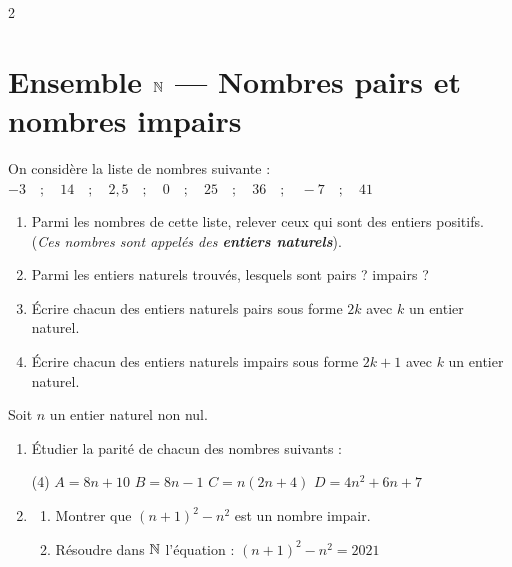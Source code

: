 \documentclass[10pt, a4paper]{article}
\begin{document}
\vspace{0.4cm}

\begin{multicols*}{2}

\section{Ensemble $\mathbb{N}$ --- Nombres pairs et nombres impairs}

\begin{Activite}[][10 min]
On considère la liste de nombres suivante :
$-3 \quad ; \quad 14 \quad ; \quad 2,5 \quad ; \quad 0 \quad ; \quad 25 \quad ; \quad 36 \quad ; \quad -7 \quad ; \quad 41$
\begin{enumerate}[leftmargin=*,itemsep=0.5pt]
    \item Parmi les nombres de cette liste, relever ceux qui sont des entiers positifs. \\
    (\textit{Ces nombres sont appelés des \textbf{entiers naturels}}).

    \item Parmi les entiers naturels trouvés, lesquels sont pairs ? impairs ?

    \item Écrire chacun des entiers naturels pairs sous forme $2k$ avec $k$ un entier naturel.
    \item Écrire chacun des entiers naturels impairs sous forme $2k+1$ avec $k$ un entier naturel.
\end{enumerate}
\end{Activite}

\begin{Application}[][15 min]
Soit $n$ un entier naturel non nul.
\begin{enumerate}[leftmargin=*,itemsep=0.5pt]
    \item Étudier la parité de chacun des nombres suivants :
\begin{tasks}[label=$\bullet$, label-width=12pt, item-indent=15pt](4)
    \task $A=8n+10$
    \task $B=8n-1$
    \task $C=n(2n+4)$
    \task $D=4n^2+6n+7$
\end{tasks}
    \item
    \begin{enumerate}[leftmargin=*,itemsep=0.5pt]
        \item Montrer que $(n + 1)^2 - n^2$ est un nombre impair.
        \item Résoudre dans $\mathbb{N}$ l'équation : $(n + 1)^2 - n^2 = 2021$
    \end{enumerate}
\end{enumerate}
\end{Application}


\end{multicols*}
\end{document}
